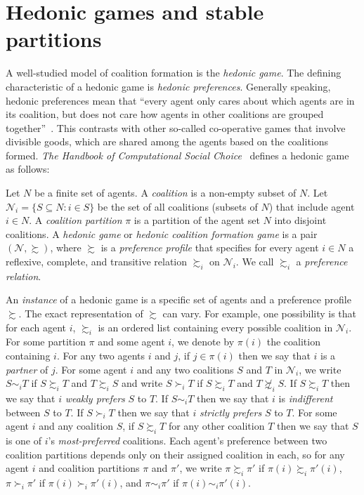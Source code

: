 \section{Hedonic games and stable partitions}
\label{sec:lit_review_hedonicgames}

A well-studied model of coalition formation is the \emph{hedonic game}. The defining characteristic of a hedonic game is \emph{hedonic preferences}. Generally speaking, hedonic preferences mean that ``every agent only cares about which agents are in its coalition, but does not care how agents in other coalitions are grouped together''~\cite{HedonicGamesHOCSC,DG80}. This contrasts with other so-called co-operative games that involve divisible goods, which are shared among the agents based on the coalitions formed. \emph{The Handbook of Computational Social Choice}~\cite{HedonicGamesHOCSC} defines a hedonic game as follows:
%
\begin{mydefinitionofhedonicgame}
\begin{adjustwidth}{8pt}{8pt}
\label{def:lit_review_hedonicgamehocs}
Let $N$ be a finite set of agents. A \emph{coalition} is a non-empty subset of $N$. Let $\mathcal{N}_i = \{ S \subseteq N : i \in S\}$ be the set of all coalitions (subsets of $N$) that include agent $i\in N$. A \emph{coalition partition} $\pi$ is a partition of the agent set $N$ into disjoint coalitions. A \emph{hedonic game} or \emph{hedonic coalition formation game} is a pair $(\mathcal{N}, \succsim)$, where $\succsim$ is a \emph{preference profile} that specifies for every agent $i\in N$ a reflexive, complete, and transitive relation $\succsim_i$ on $\mathcal{N}_i$. We call $\succsim_i$ a \emph{preference relation}.
\end{adjustwidth}
\end{mydefinitionofhedonicgame}
%
An \emph{instance} of a hedonic game is a specific set of agents and a preference profile $\succsim$. The exact representation of $\succsim$ can vary. For example, one possibility is that for each agent $i$, $\succsim_i$ is an ordered list containing every possible coalition in $\mathcal{N}_i$. For some partition $\pi$ and some agent $i$, we denote by $\pi(i)$ the coalition containing $i$. For any two agents $i$ and $j$, if $j \in \pi(i)$ then we say that $i$ is a \emph{partner} of $j$. For some agent $i$ and any two coalitions $S$ and $T$ in $\mathcal{N}_i$, we write $S \sim_i T$ if $S \succsim_i T$ and $T \succsim_i S$ and write $S \succ_i T$ if $S \succsim_i T$ and $T \not\succsim_i S$. If $S \succsim_i T$ then we say that $i$ \emph{weakly prefers} $S$ to $T$. If $S \sim_i T$ then we say that $i$ is \emph{indifferent} between $S$ to $T$. If $S \succ_i T$ then we say that $i$ \emph{strictly prefers} $S$ to $T$. For some agent $i$ and any coalition $S$, if $S \succsim_i T$ for any other coalition $T$ then we say that $S$ is one of $i$'s \emph{most-preferred} coalitions. Each agent's preference between two coalition partitions depends only on their assigned coalition in each, so for any agent $i$ and coalition partitions $\pi$ and $\pi'$, we write $\pi \succsim_i \pi'$ if $\pi(i) \succsim_i \pi'(i)$, $\pi \succ_i \pi'$ if $\pi(i) \succ_i \pi'(i)$, and $\pi \sim_i \pi'$ if $\pi(i) \sim_i \pi'(i)$.

